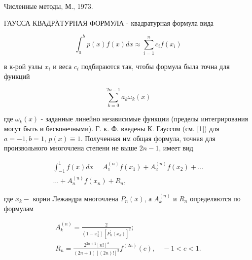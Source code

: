 \documentclass[10pt]{article}
\begin{document}
Численные методы, М., 1973.



ГАУССА КВАДРӒТУРНАЯ ФОРМУЛА - квадратурная формула вида



\[

\int_{a}^{b} p(x) f(x) d x \approx \sum_{i=1}^{n} c_{i} f\left(x_{i}\right)

\]



в к-рой узлы $x_{i}$ и веса $c_{i}$ подбираются так, чтобы формула была точна для функций



\[

\sum_{k=0}^{2 n-1} a_{k} \omega_{k}(x)

\]



где $\omega_{k}(x)$ - заданные линейно независимые функции (пределы интегрирования могут быть и бесконечными). Г. к. Ф. введены К. Гауссом (см. [1]) для $a=-1, b=1$, $p(x) \equiv 1$. Полученная им общая формула, точная для произвольного многочлена степени не выше $2 n-1$, имеет вид



\[

\begin{gathered}

\int_{-1}^{1} f(x) d x=A_{1}^{(n)} f\left(x_{1}\right)+A_{2}^{(n)} f\left(x_{2}\right)+\ldots \\

\ldots+A_{n}^{(n)} f\left(x_{n}\right)+R_{n},

\end{gathered}

\]



где $x_{k}-$ корни Лежандра многочлена $P_{n}(x)$, а $A_{k}^{(n)}$ и $R_{n}$ определяются по формулам



\[

\begin{gathered}

A_{k}^{(n)}=\frac{2}{\left(1-x_{k}^{2}\right)\left[P_{n}^{\prime}\left(x_{k}\right)\right]^{2}} ; \\

R_{n}=\frac{2^{2 n+1}[n !]^{4}}{(2 n+1)[(2 n) !]^{3}} f^{(2 n)}(c), \quad-1<c<1 .

\end{gathered}

\]
\end{document}

